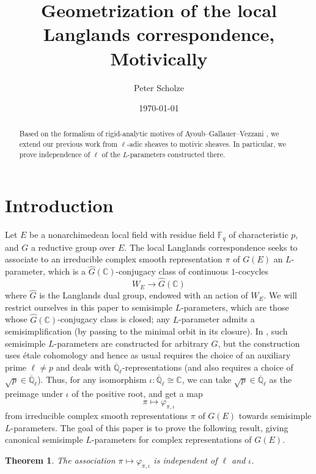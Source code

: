 \documentclass[11pt]{amsart}
\date{\today}
\title[Geometrization of local Langlands, Motivically]{Geometrization of the local Langlands correspondence, Motivically}
\author{Peter Scholze}
\numberwithin{equation}{section}
\newtheorem{theorem}{Theorem}
\numberwithin{theorem}{section}
\theoremstyle{definition}
\begin{document}
\begin{abstract} Based on the formalism of rigid-analytic motives of Ayoub--Gallauer--Vezzani \cite{AyoubGallauerVezzani}, we extend our previous work \cite{FarguesScholze} from $\ell$-adic sheaves to motivic sheaves. In particular, we prove independence of $\ell$ of the $L$-parameters constructed there.
\end{abstract}

\maketitle

\tableofcontents


\section{Introduction}

Let $E$ be a nonarchimedean local field with residue field $\mathbb F_q$ of characteristic $p$, and $G$ a reductive group over $E$. The local Langlands correspondence seeks to associate to an irreducible complex smooth representation $\pi$ of $G(E)$ an $L$-parameter, which is a $\widehat{G}(\mathbb C)$-conjugacy class of continuous $1$-cocycles
\[
W_E\to \widehat{G}(\mathbb C)
\]
where $\widehat{G}$ is the Langlands dual group, endowed with an action of $W_E$. We will restrict ourselves in this paper to semisimple $L$-parameters, which are those whose $\widehat{G}(\mathbb C)$-conjugacy class is closed; any $L$-parameter admits a semisimplification (by passing to the minimal orbit in its closure). In \cite{FarguesScholze}, such semisimple $L$-parameters are constructed for arbitrary $G$, but the construction uses \'etale cohomology and hence as usual requires the choice of an auxiliary prime $\ell\neq p$ and deals with $\overline{\mathbb Q}_\ell$-representations (and also requires a choice of $\sqrt{p}\in \overline{\mathbb Q}_\ell$). Thus, for any isomorphism $\iota: \overline{\mathbb Q}_\ell\cong \mathbb C$, we can take $\sqrt{p}\in \overline{\mathbb Q}_\ell$ as the preimage under $\iota$ of the positive root, and get a map
\[
\pi\mapsto \varphi_{\pi,\iota}
\]
from irreducible complex smooth representations $\pi$ of $G(E)$ towards semisimple $L$-parameters. The goal of this paper is to prove the following result, giving canonical semisimple $L$-parameters for complex representations of $G(E)$.

\begin{theorem}\label{thm:A} The association $\pi\mapsto \varphi_{\pi,\iota}$ is independent of $\ell$ and $\iota$.
\end{theorem}
\end{document}
